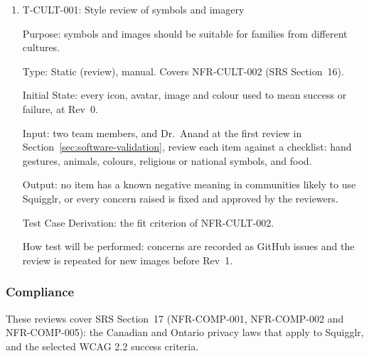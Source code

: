 \documentclass[12pt, titlepage]{article}
\newcommand{\testitem}[1]{\item #1\par\nopagebreak}
\begin{document}
\begin{enumerate}

\testitem{T-CULT-001: Style review of symbols and imagery}

Purpose: symbols and images should be suitable for families from different cultures.

Type: Static (review), manual. Covers NFR-CULT-002 (SRS Section~16).

Initial State: every icon, avatar, image and colour used to mean success or
failure, at Rev~0.

Input: two team members, and Dr.\ Anand at the first review in
Section~\ref{sec:software-validation}, review each item against a checklist: hand gestures, animals, colours,
religious or national symbols, and food.

Output: no item has a known negative meaning in communities likely to use
Squigglr, or every concern raised is fixed and approved by the reviewers.

Test Case Derivation: the fit criterion of NFR-CULT-002.

How test will be performed: concerns are recorded as GitHub issues and
the review is repeated for new images before Rev~1.

\end{enumerate}

\subsubsection{Compliance}
\label{sec:comp-tests}

These reviews cover SRS Section~17 (NFR-COMP-001, NFR-COMP-002 and NFR-COMP-005): the
Canadian and Ontario privacy laws that apply to Squigglr, and the selected
WCAG 2.2 success criteria.
\end{document}
